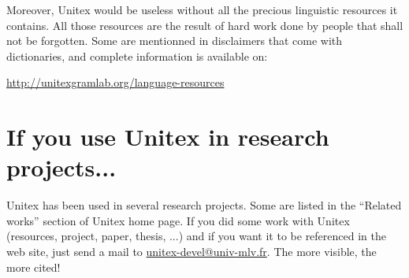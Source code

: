 \bigskip
\noindent Moreover, Unitex would be useless without all the precious linguistic
resources it contains. All those resources are the result of hard work done
by people that shall not be forgotten. Some are mentionned in disclaimers that
come with dictionaries, and complete information is available on:

\bigskip
\noindent \url{http://unitexgramlab.org/language-resources}


\section*{If you use Unitex in research projects...}
Unitex has been used in several research projects. Some are listed in the
``Related works'' section of Unitex home page. If you did some work with Unitex
(resources, project, paper, thesis, ...) and if you want it to be referenced in
the web site, just send a mail to \url{unitex-devel@univ-mlv.fr}. The more visible,
the more cited!
